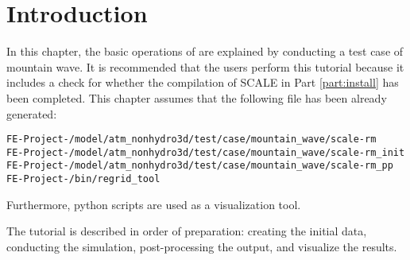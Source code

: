 \section{Introduction} \label{sec:ideal_exp_intro}


In this chapter, 
the basic operations of \scaledg are explained by conducting a test case of mountain wave. 
It is recommended that the users perform this tutorial 
because it includes a check for whether the compilation of SCALE in Part \ref{part:install} has been completed. 
This chapter assumes that the following file has been already generated:
\begin{alltt}
  FE-Project-{\version}/model/atm_nonhydro3d/test/case/mountain_wave/scale-rm
  FE-Project-{\version}/model/atm_nonhydro3d/test/case/mountain_wave/scale-rm_init
  FE-Project-{\version}/model/atm_nonhydro3d/test/case/mountain_wave/scale-rm_pp
  FE-Project-{\version}/bin/regrid_tool
\end{alltt}
Furthermore, 
python scripts are used as a visualization tool. 

The tutorial is described in order of preparation: creating the initial data, conducting the simulation, 
post-processing the output, 
and visualize the results.
